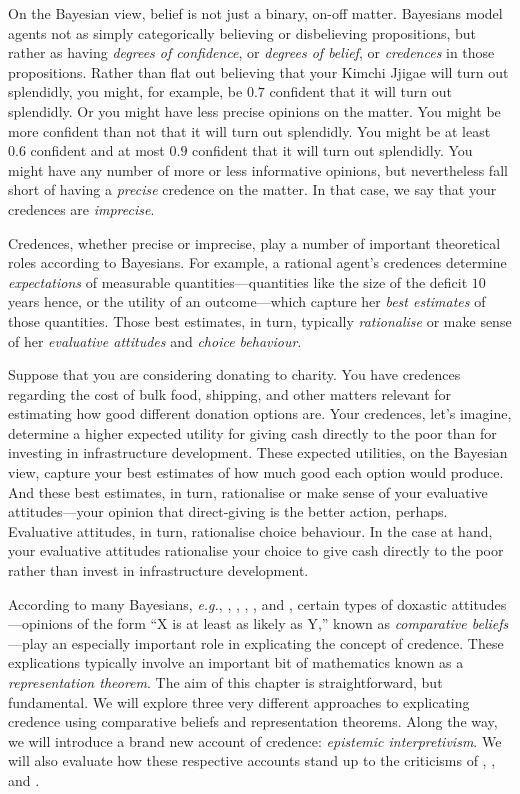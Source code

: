 On the Bayesian view, belief is not just a binary, on-off matter. Bayesians model agents not as simply categorically believing or disbelieving propositions, but rather as having \emph{degrees of confidence}, or \emph{degrees of belief}, or \emph{credences} in those propositions. Rather than flat out believing that your Kimchi Jjigae will turn out splendidly, you might, for example, be $0.7$ confident that it will turn out splendidly. Or you might have less precise opinions on the matter. You might be more confident than not that it will turn out splendidly. You might be at least $0.6$ confident and at most $0.9$ confident that it will turn out splendidly. You might have any number of more or less informative opinions, but nevertheless fall short of having a \emph{precise} credence on the matter. In that case, we say that your credences are \textit{imprecise}.

Credences, whether precise or imprecise, play a number of important theoretical roles according to Bayesians. For example, a rational agent's credences determine \textit{expectations} of measurable quantities---quantities like the size of the deficit $10$ years hence, or the utility of an outcome---which capture her \textit{best estimates} of those quantities. Those best estimates, in turn, typically \textit{rationalise} or make sense of her \textit{evaluative attitudes} and \textit{choice behaviour}.

Suppose that you are considering donating to charity. You have credences regarding the cost of bulk food, shipping, and other matters relevant for estimating how good different donation options are. Your credences, let's imagine, determine a higher expected utility for giving cash directly to the poor than for investing in infrastructure development. These expected utilities, on the Bayesian view, capture your best estimates of how much good each option would produce. And these best estimates, in turn, rationalise or make sense of your evaluative attitudes---your opinion that direct-giving is the better action, perhaps. Evaluative attitudes, in turn, rationalise choice behaviour. In the case at hand, your evaluative attitudes rationalise your choice to give cash directly to the poor rather than invest in infrastructure development.

According to many Bayesians, \textit{e.g.}, \citet{Koopman1940b, Koopman1940a}, \citet{Good1950}, \citet{deFinetti1951}, \citet{Savage1954}, and \citet{Joyce2010}, certain types of doxastic attitudes---opinions of the form ``X is at least as likely as Y,'' known as \textit{comparative beliefs}---play an especially important role in explicating the concept of credence. These explications typically involve an important bit of mathematics known as a \textit{representation theorem}. The aim of this chapter is straightforward, but fundamental. We will explore three very different approaches to explicating credence using comparative beliefs and representation theorems. Along the way, we will introduce a brand new account of credence: \textit{epistemic interpretivism}. We will also evaluate how these respective accounts stand up to the criticisms of \citet{Hajek2009b}, \citet{Meacham2011}, and \citet{Titelbaum2015}.

